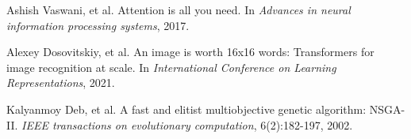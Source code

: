 \documentclass[11pt, a4paper]{article}
\begin{document}
\begin{thebibliography}{9}
Ashish Vaswani, et al.
\newblock Attention is all you need.
\newblock In \textit{Advances in neural information processing systems}, 2017.

Alexey Dosovitskiy, et al.
\newblock An image is worth 16x16 words: Transformers for image recognition at scale.
\newblock In \textit{International Conference on Learning Representations}, 2021.

Kalyanmoy Deb, et al.
\newblock A fast and elitist multiobjective genetic algorithm: NSGA-II.
\newblock \textit{IEEE transactions on evolutionary computation}, 6(2):182-197, 2002.
\end{thebibliography}
\end{document}
